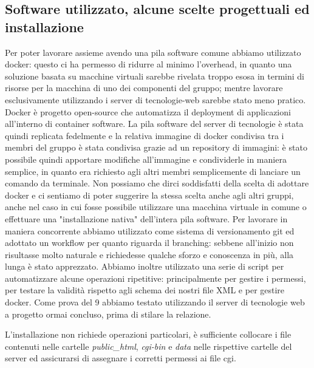 \subsection{Software utilizzato, alcune scelte progettuali ed installazione}
Per poter lavorare assieme avendo una pila software comune abbiamo utilizzato docker: questo ci ha permesso di ridurre al minimo l'overhead, in quanto una soluzione basata su macchine virtuali sarebbe rivelata troppo esosa in termini di risorse per la macchina di uno dei componenti del gruppo; mentre lavorare esclusivamente utilizzando i server di tecnologie-web sarebbe stato meno pratico.
Docker è progetto open-source che automatizza il deployment di applicazioni all'interno di container software.
La pila software del server di tecnologie è stata quindi replicata fedelmente e la relativa immagine di docker condivisa tra i membri del gruppo è stata condivisa grazie ad un repository di immagini: è stato possibile quindi apportare modifiche all'immagine e condividerle in maniera semplice, in quanto era richiesto agli altri membri semplicemente di lanciare un comando da terminale.
Non possiamo che dirci soddisfatti della scelta di adottare docker e ci sentiamo di poter suggerire la stessa scelta anche agli altri gruppi, anche nel caso in cui fosse possibile utilizzare una macchina virtuale in comune o effettuare una "installazione nativa" dell'intera pila software.
Per lavorare in maniera concorrente abbiamo utilizzato come sistema di versionamento git ed adottato un workflow per quanto riguarda il branching: sebbene all'inizio non risultasse molto naturale e richiedesse qualche sforzo e conoscenza in più, alla lunga è stato apprezzato.
Abbiamo inoltre utilizzato una serie di script per automatizzare alcune operazioni ripetitive: principalmente per gestire i permessi, per testare la validità rispetto agli schema dei nostri file XML e per gestire docker.
Come prova del 9 abbiamo testato utilizzando il server di tecnologie web a progetto ormai concluso, prima di stilare la relazione.

L'installazione non richiede operazioni particolari, è sufficiente collocare i file contenuti nelle cartelle \textit{public\_html}, \textit{cgi-bin} e \textit{data} nelle rispettive cartelle del server ed assicurarsi di assegnare i corretti permessi ai file cgi.
